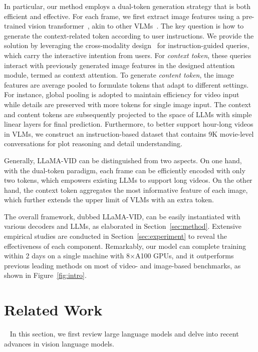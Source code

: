 In particular, our method employs a dual-token generation strategy that is both efficient and effective. 
For each frame, we first extract image features using a pre-trained vision transformer~\cite{vit}, akin to other VLMs~\cite{instructblip,llava}. 
The key question is how to generate the context-related token according to user instructions.
We provide the solution by leveraging the cross-modality design~\cite{devlin2018bert,blip2} for instruction-guided queries, which carry the interactive intention from users.
For {\em context token}, these queries interact with previously generated image features in the designed attention module, termed as context attention.
To generate {\em content token}, the image features are average pooled to formulate tokens that adapt to different settings.
For instance, global pooling is adopted to maintain efficiency for video input while details are preserved with more tokens for single image input. 
The context and content tokens are subsequently projected to the space of LLMs with simple linear layers for final prediction.
Furthermore, to better support hour-long videos in VLMs, we construct an instruction-based dataset that contains 9K movie-level conversations for plot reasoning and detail understanding.

Generally, LLaMA-VID can be distinguished from two aspects.
On one hand, with the dual-token paradigm, each frame can be efficiently encoded with only two tokens, which empowers existing LLMs to support long videos.
On the other hand, the context token aggregates the most informative feature of each image, which further extends the upper limit of VLMs with an extra token. 

The overall framework, dubbed LLaMA-VID, can be easily instantiated with various decoders and LLMs, as elaborated in Section~\ref{sec:method}.
Extensive empirical studies are conducted in Section~\ref{sec:experiment} to reveal the effectiveness of each component.
Remarkably, our model can complete training within 2 days on a single machine with 8$\times$A100 GPUs, and it outperforms previous leading methods on most of video- and image-based benchmarks, as shown in Figure~\ref{fig:intro}.

\section{Related Work}~\label{sec:related}
In this section, we first review large language models and delve into recent advances in vision language models.
